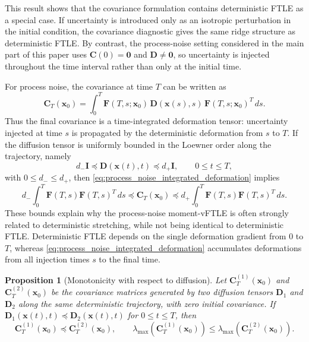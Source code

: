 \documentclass[a4paper,11pt]{article}
\numberwithin{equation}{section}
\theoremstyle{plain}
\newtheorem{proposition}[theorem]{Proposition}
\theoremstyle{definition}
\theoremstyle{remark}
\newcommand{\bx}{\mathbf{x}}
\newcommand{\bC}{\mathbf{C}}
\newcommand{\bD}{\mathbf{D}}
\newcommand{\bF}{\mathbf{F}}
\newcommand{\bI}{\mathbf{I}}
\newcommand{\bzero}{\mathbf{0}}
\newcommand{\lmax}{\lambda_{\max}}
\begin{document}
This result shows that the covariance formulation contains deterministic FTLE as a special case.  If uncertainty is introduced only as an isotropic perturbation in the initial condition, the covariance diagnostic gives the same ridge structure as deterministic FTLE.  By contrast, the process-noise setting considered in the main part of this paper uses \(\bC(0)=\bzero\) and \(\bD\neq\bzero\), so uncertainty is injected throughout the time interval rather than only at the initial time.

For process noise, the covariance at time \(T\) can be written as
\begin{equation}
    \bC_T(\bx_0)
    =
    \int_0^T
    \bF(T,s;\bx_0)\,\bD(\bx(s),s)\,\bF(T,s;\bx_0)^T\,ds .
    \label{eq:process_noise_integrated_deformation}
\end{equation}
Thus the final covariance is a time-integrated deformation tensor: uncertainty injected at time \(s\) is propagated by the deterministic deformation from \(s\) to \(T\).  If the diffusion tensor is uniformly bounded in the Loewner order along the trajectory, namely
\[
    d_-\bI \preceq \bD(\bx(t),t) \preceq d_+\bI,
    \qquad 0\leq t\leq T,
\]
with \(0\leq d_-\leq d_+\), then \eqref{eq:process_noise_integrated_deformation} implies
\begin{equation}
    d_-\int_0^T \bF(T,s)\bF(T,s)^T\,ds
    \preceq
    \bC_T(\bx_0)
    \preceq
    d_+\int_0^T \bF(T,s)\bF(T,s)^T\,ds .
    \label{eq:deformation_integral_bounds}
\end{equation}
These bounds explain why the process-noise moment-vFTLE is often strongly related to deterministic stretching, while not being identical to deterministic FTLE.  Deterministic FTLE depends on the single deformation gradient from \(0\) to \(T\), whereas \eqref{eq:process_noise_integrated_deformation} accumulates deformations from all injection times \(s\) to the final time.

\begin{proposition}[Monotonicity with respect to diffusion]\label{prop:diffusion_monotonicity}
Let \(\bC_T^{(1)}(\bx_0)\) and \(\bC_T^{(2)}(\bx_0)\) be the covariance matrices generated by two diffusion tensors \(\bD_1\) and \(\bD_2\) along the same deterministic trajectory, with zero initial covariance.  If \(\bD_1(\bx(t),t)\preceq \bD_2(\bx(t),t)\) for \(0\leq t\leq T\), then
\[
    \bC_T^{(1)}(\bx_0)\preceq \bC_T^{(2)}(\bx_0),
    \qquad
    \lmax\!\left(\bC_T^{(1)}(\bx_0)\right)
    \leq
    \lmax\!\left(\bC_T^{(2)}(\bx_0)\right).
\]
\end{proposition}
\end{document}
